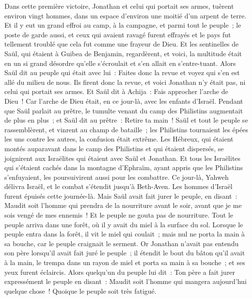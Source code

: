 \begin{multicols}{2}
Dans cette première victoire, Jonathan et celui qui portait ses armes, tuèrent environ vingt hommes, dans un espace d'environ une moitié d'un arpent de terre.
Et il y eut un grand effroi au camp, à la campagne, et parmi tout le peuple~; le poste de garde aussi, et ceux qui avaient ravagé furent effrayés et le pays fut tellement troublé que cela fut comme une frayeur de Dieu.
Et les sentinelles de Saül, qui étaient à Guibea de Benjamin, regardèrent, et voici, la multitude était en un si grand désordre qu'elle s'écroulait et s'en allait en s'entre-tuant.
Alors Saül dit au peuple qui était avec lui~: Faites donc la revue et voyez qui s'en est allé du milieu de nous. Ils firent donc la revue, et voici Jonathan n'y était pas, ni celui qui portait ses armes.
Et Saül dit à Achija~: Fais approcher l'arche de Dieu~! Car l'arche de Dieu était, en ce jour-là, avec les enfants d'Israël.
Pendant que Saül parlait au prêtre, le tumulte venant du camp des Philistins augmentait de plus en plus~; et Saül dit au prêtre~: Retire ta main~!
Saül et tout le peuple se rassemblèrent, et vinrent au champ de bataille~; les Philistins tournaient les épées les uns contre les autres, la confusion était extrême.
Les Hébreux, qui étaient montés auparavant dans le camp des Philistins et qui étaient dispersés, se joignirent aux Israëlites qui étaient avec Saül et Jonathan.
Et tous les Israëlites qui s'étaient cachés dans la montagne d'Ephraïm, ayant appris que les Philistins s'enfuyaient, les poursuivirent aussi pour les combattre.
Ce jour-là, Yahweh délivra Israël, et le combat s'étendit jusqu'à Beth-Aven.
Les hommes d'Israël furent épuisés cette journée-là. Mais Saül avait fait jurer le peuple, en disant~: Maudit soit l'homme qui prendra de la nourriture avant le soir, avant que je me sois vengé de mes ennemis~! Et le peuple ne gouta pas de nourriture.
Tout le peuple arriva dans une forêt, où il y avait du miel à la surface du sol.
Lorsque le peuple entra dans la forêt, il vit le miel qui coulait~; mais nul ne porta la main à sa bouche, car le peuple craignait le serment.
Or Jonathan n'avait pas entendu son père lorsqu'il avait fait juré le peuple~; il étendit le bout du bâton qu'il avait à la main, le trempa dans un rayon de miel et porta sa main à sa bouche~; et ses yeux furent éclaircis.
Alors quelqu'un du peuple lui dit~: Ton père a fait jurer expressément le peuple en disant~: Maudit soit l'homme qui mangera aujourd'hui quelque chose~! Quoique le peuple soit très fatigué.

\end{multicols}
